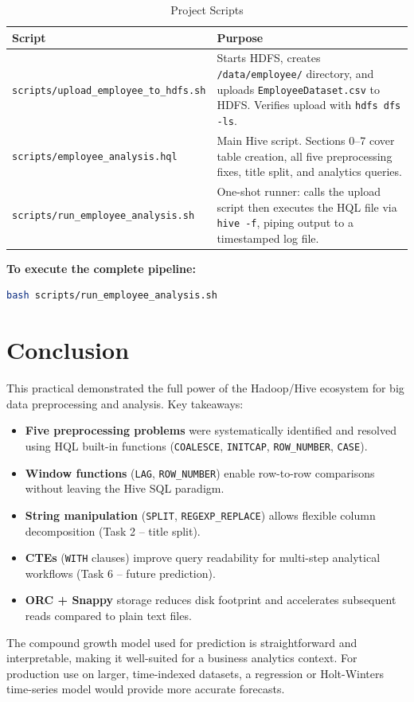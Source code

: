\documentclass[11pt,a4paper]{article}
\begin{document}
\begin{table}[H]
\centering
\caption{Project Scripts}
\begin{tabularx}{\textwidth}{@{}lX@{}}
\toprule
\textbf{Script} & \textbf{Purpose} \\
\midrule
\texttt{scripts/upload\_employee\_to\_hdfs.sh} &
    Starts HDFS, creates \texttt{/data/employee/} directory, and uploads
    \texttt{EmployeeDataset.csv} to HDFS. Verifies upload with \texttt{hdfs dfs -ls}. \\[4pt]
\texttt{scripts/employee\_analysis.hql} &
    Main Hive script.  Sections 0--7 cover table creation, all five
    preprocessing fixes, title split, and analytics queries. \\[4pt]
\texttt{scripts/run\_employee\_analysis.sh} &
    One-shot runner: calls the upload script then executes the HQL file
    via \texttt{hive -f}, piping output to a timestamped log file. \\
\bottomrule
\end{tabularx}
\end{table}

\textbf{To execute the complete pipeline:}
\begin{lstlisting}[language=bash, caption={Running the full analysis from the project root}]
bash scripts/run_employee_analysis.sh
\end{lstlisting}

\section{Conclusion}

This practical demonstrated the full power of the Hadoop/Hive ecosystem for
big data preprocessing and analysis.  Key takeaways:

\begin{itemize}
    \item \textbf{Five preprocessing problems} were systematically identified
          and resolved using HQL built-in functions
          (\texttt{COALESCE}, \texttt{INITCAP}, \texttt{ROW\_NUMBER}, \texttt{CASE}).
    \item \textbf{Window functions} (\texttt{LAG}, \texttt{ROW\_NUMBER})
          enable row-to-row comparisons without leaving the Hive SQL paradigm.
    \item \textbf{String manipulation} (\texttt{SPLIT}, \texttt{REGEXP\_REPLACE})
          allows flexible column decomposition (Task 2 -- title split).
    \item \textbf{CTEs} (\texttt{WITH} clauses) improve query readability for
          multi-step analytical workflows (Task 6 -- future prediction).
    \item \textbf{ORC + Snappy} storage reduces disk footprint and accelerates
          subsequent reads compared to plain text files.
\end{itemize}

The compound growth model used for prediction is straightforward and interpretable,
making it well-suited for a business analytics context.  For production use on
larger, time-indexed datasets, a regression or Holt-Winters time-series model
would provide more accurate forecasts.
\end{document}
